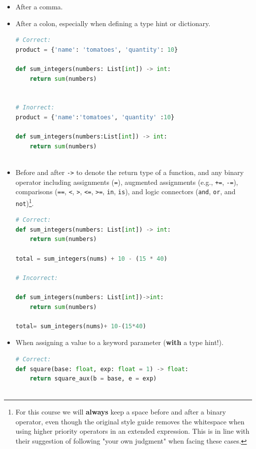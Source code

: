 \documentclass{tufte-handout}
\begin{document}
\begin{itemize}
    \item After a comma.
	\item After a colon, especially when defining a type hint or dictionary.
	
\begin{lstlisting}[numbers=none,language=python]
# Correct:
product = {'name': 'tomatoes', 'quantity': 10}

def sum_integers(numbers: List[int]) -> int:
	return sum(numbers)
	
	
# Inorrect:
product = {'name':'tomatoes', 'quantity' :10}

def sum_integers(numbers:List[int]) -> int:
    return sum(numbers)
	
\end{lstlisting}
	
	\item Before and after \texttt{->} to denote the return type of a function, and any binary operator including assignments (\texttt{=}), augmented assignments (e.g., \texttt{+=}, \texttt{-=}), comparisons (\texttt{==}, \texttt{<}, \texttt{>}, \texttt{<=}, \texttt{>=}, \texttt{in}, \texttt{is}), and logic connectors (\texttt{and}, \texttt{or}, and \texttt{not})\footnote{For this course we will \textbf{always} keep a space before and after a binary operator, even though the original style guide removes the whitespace when using higher priority operators in an extended expression. This is in line with their suggestion of following "your own judgment" when facing these cases.}.

\begin{lstlisting}[numbers=none,language=python]
# Correct:
def sum_integers(numbers: List[int]) -> int:
    return sum(numbers)

total = sum_integers(nums) + 10 - (15 * 40)

# Incorrect:

def sum_integers(numbers: List[int])->int:
    return sum(numbers)
    
total= sum_integers(nums)+ 10-(15*40)

\end{lstlisting}
	
	\item When assigning a value to a keyword parameter (\textbf{with} a type hint!).
	
\begin{lstlisting}[numbers=none,language=python]
# Correct:
def square(base: float, exp: float = 1) -> float:
    return square_aux(b = base, e = exp)
			

\end{lstlisting}
\end{itemize}
\end{document}
